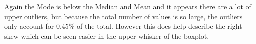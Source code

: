 \documentclass[10pt]{article}
\begin{document}
\par
{}%
\hfill
{}%
\par
Again the Mode is below the Median and Mean and it appears there are a lot of upper outliers, but because the total number of values is so large, the outliers only account for 0.45\% of the total. However this does help describe the right-skew which can be seen easier in the upper whisker of the boxplot.
\end{document}
